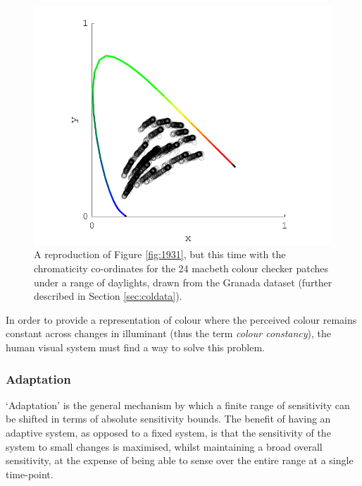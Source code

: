 \begin{figure}[htbp]
\includegraphics[max width=\textwidth]{figs/LitRev/ColorimetryDemo6.pdf}
\caption{A reproduction of Figure \ref{fig:1931}, but this time with the chromaticity co-ordinates for the 24 macbeth colour checker patches under a range of daylights, drawn from the Granada dataset \citep{hernandez-andres_color_2001} (further described in Section \ref{sec:coldata}).}
\label{fig:problem}
\end{figure}

In order to provide a representation of colour where the perceived colour remains constant across changes in illuminant (thus the term \emph{colour constancy}), the human visual system must find a way to solve this problem.

\subsubsection{Adaptation}

`Adaptation' is the general mechanism by which a finite range of sensitivity can be shifted in terms of absolute sensitivity bounds. The benefit of having an adaptive system, as opposed to a fixed system, is that the sensitivity of the system to small changes is maximised, whilst maintaining a broad overall sensitivity, at the expense of being able to sense over the entire range at a single time-point. 

